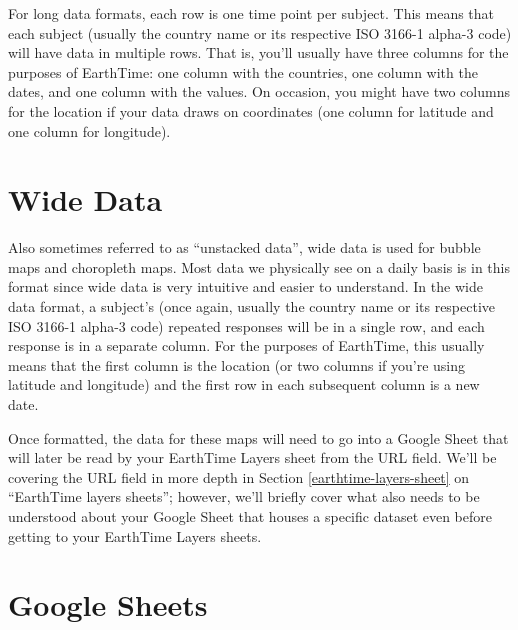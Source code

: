 \documentclass[
]{book}
\begin{document}
For long data formats, each row is one time point per subject. This means that each subject (usually the country name or its respective ISO 3166-1 alpha-3 code) will have data in multiple rows. That is, you'll usually have three columns for the purposes of EarthTime: one column with the countries, one column with the dates, and one column with the values. On occasion, you might have two columns for the location if your data draws on coordinates (one column for latitude and one column for longitude).

\hypertarget{wide-data}{%
\section{Wide Data}\label{wide-data}}

Also sometimes referred to as ``unstacked data'', wide data is used for bubble maps and choropleth maps. Most data we physically see on a daily basis is in this format since wide data is very intuitive and easier to understand. In the wide data format, a subject's (once again, usually the country name or its respective ISO 3166-1 alpha-3 code) repeated responses will be in a single row, and each response is in a separate column. For the purposes of EarthTime, this usually means that the first column is the location (or two columns if you're using latitude and longitude) and the first row in each subsequent column is a new date.

Once formatted, the data for these maps will need to go into a Google Sheet that will later be read by your EarthTime Layers sheet from the URL field. We'll be covering the URL field in more depth in Section \ref{earthtime-layers-sheet} on ``EarthTime layers sheets''; however, we'll briefly cover what also needs to be understood about your Google Sheet that houses a specific dataset even before getting to your EarthTime Layers sheets.

\hypertarget{google-sheets}{%
\section{Google Sheets}\label{google-sheets}}
\end{document}
